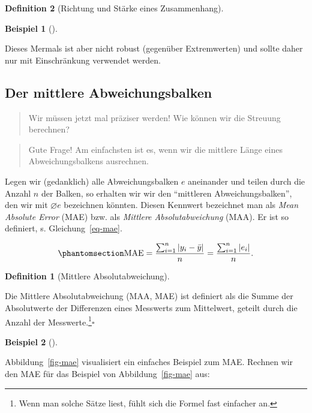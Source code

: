 \documentclass[
  a4paper,
  DIV=11]{scrreprt}
\theoremstyle{definition}
\theoremstyle{definition}
\newtheorem{example}{Beispiel}[chapter]
\theoremstyle{definition}
\newtheorem{definition}{Definition}[chapter]
\theoremstyle{remark}
\begin{document}
\begin{definition}[Richtung und Stärke eines
Zusammenhang]
\begin{example}[]
\end{example}

Dieses Mermals ist aber nicht robust (gegenüber Extremwerten) und sollte
daher nur mit Einschränkung verwendet werden.

\subsection{Der mittlere
Abweichungsbalken}\label{der-mittlere-abweichungsbalken}

\begin{quote}
{} Wir müssen jetzt mal präziser werden! Wie können wir
die Streuung berechnen?
\end{quote}

\begin{quote}
{} Gute Frage! Am einfachsten ist es, wenn wir die
mittlere Länge eines Abweichungsbalkens ausrechnen.
\end{quote}

Legen wir (gedanklich) alle Abweichungsbalken \(e\) aneinander und
teilen durch die Anzahl \(n\) der Balken, so erhalten wir wir den
``mittleren Abweichungsbalken'', den wir mit \(\varnothing e\)
bezeichnen könnten. Diesen Kennwert bezeichnet man als \emph{Mean
Absolute Error} (MAE) bzw. als \emph{Mittlere Absolutabweichung} (MAA).
Er ist so definiert, s. Gleichung~\ref{eq-mae}.

\begin{equation}\phantomsection\label{eq-mae}{{\displaystyle \mathrm {MAE} ={\frac {\sum _{i=1}^{n}\left|y_{i}-\bar{y}\right|}{n}}={\frac {\sum _{i=1}^{n}\left|e_{i}\right|}{n}}.}}\end{equation}

\begin{definition}[Mittlere
Absolutabweichung]\protect\hypertarget{def-mae}{}\label{def-mae}

Die Mittlere Absolutabweichung (MAA, MAE) ist definiert als die Summe
der Absolutwerte der Differenzen eines Messwerts zum Mittelwert, geteilt
durch die Anzahl der Messwerte.\footnote{Wenn man solche Sätze liest,
  fühlt sich die Formel fast einfacher an.}\(\square\)

\end{definition}

\begin{example}[]\protect\hypertarget{exm-mae}{}\label{exm-mae}

Abbildung~\ref{fig-mae} visualisiert ein einfaches Beispiel zum MAE.
Rechnen wir den MAE für das Beispiel von Abbildung~\ref{fig-mae} aus:


\end{example}
\end{definition}
\end{document}

